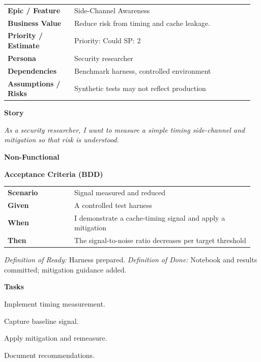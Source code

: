 \documentclass[11pt,letterpaper]{article}
\makeatletter
\newenvironment{kvtable}{%
  \par\noindent\begin{tabular}{@{}>{\raggedright\bfseries\arraybackslash}p{0.26\linewidth} >{\raggedright\arraybackslash}p{0.70\linewidth}@{}}
}{\end{tabular}\par}
\newenvironment{bdd}{%
  \par\noindent\begin{tabular}{@{}>{\raggedright\bfseries\arraybackslash}p{0.26\linewidth} >{\raggedright\arraybackslash}p{0.70\linewidth}@{}}
}{\end{tabular}\par}
\newcommand{\DoRDoD}[2]{%
  \vspace{0.35em}
  {\footnotesize\color{Muted}%
    \textit{Definition of Ready:} #1 \; \textbullet\;
    \textit{Definition of Done:} #2%
  }%
}
\newenvironment{storycard}[2]{%
  \begin{tcolorbox}[cloudcard, title={#1 --- #2}]%
}{\end{tcolorbox}}
\newcommand{\sectionlabel}[1]{\par\vspace{0.35em}\textbf{#1}\par}
\makeatother
\begin{document}
\begin{storycard}{CCS-32}{Ch. 32 — Side-Channel Attacks \& Defenses}
\begin{kvtable}
Epic / Feature & Side-Channel Awareness\\
Business Value & Reduce risk from timing and cache leakage.\\
Priority / Estimate & Priority: Could \quad SP: 2\\
Persona & Security researcher\\
Dependencies & Benchmark harness, controlled environment\\
Assumptions / Risks & Synthetic tests may not reflect production\\
\end{kvtable}
\sectionlabel{Story}
\textit{As a security researcher, I want to measure a simple timing side-channel and mitigation so that risk is understood.}
\sectionlabel{Non-Functional}\;
\sectionlabel{Acceptance Criteria (BDD)}
\begin{bdd}
Scenario & Signal measured and reduced\\
Given & A controlled test harness\\
When & I demonstrate a cache-timing signal and apply a mitigation\\
Then & The signal-to-noise ratio decreases per target threshold\\
\end{bdd}
\DoRDoD{Harness prepared.}{Notebook and results committed; mitigation guidance added.}
\sectionlabel{Tasks}
\begin{checklist}
\item Implement timing measurement.
\item Capture baseline signal.
\item Apply mitigation and remeasure.
\item Document recommendations.
\end{checklist}
\end{storycard}
\end{document}
